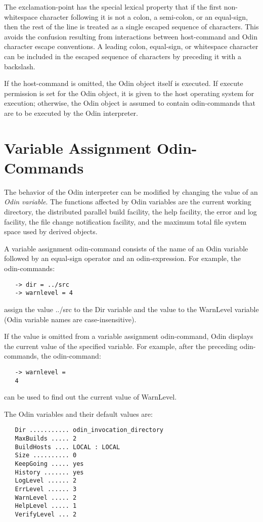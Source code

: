 The exclamation-point has the special lexical property that if the
first non-whitespace character following it
is not a colon, a semi-colon, or an equal-sign,
then the rest of the line is treated as a single escaped sequence of
characters.
This avoids the confusion resulting from interactions between host-command
and Odin character escape conventions.
A leading colon, equal-sign, or whitespace character can be
included in the escaped sequence of characters by preceding it
with a backslash.

If the host-command is omitted, the Odin object itself is executed.
If execute permission is set for the Odin object,
it is given to the host operating system for execution;
otherwise, the Odin object is assumed to contain odin-commands that are 
to be executed by the Odin interpreter.


\section{Variable Assignment Odin-Commands}
\label{variable}

The behavior of the Odin interpreter can be modified by changing the value
of an {\em Odin variable}.
The functions affected by Odin variables are
the current working directory,
the distributed parallel build facility,
the help facility, the error and log facility,
the file change notification facility, and
the maximum total file system space used by derived objects.

A variable assignment odin-command consists of the name of an Odin variable
followed by an equal-sign operator and an odin-expression.
For example, the odin-commands:
\begin{verbatim}
   -> dir = ../src
   -> warnlevel = 4
\end{verbatim}
assign the value {\ex ../src} to the {\ex Dir} variable
and the value {} to the {\ex WarnLevel} variable
(Odin variable names are case-insensitive).

If the value is omitted from a variable assignment odin-command,
Odin displays the current value of the specified variable.
For example, after the preceding odin-commands, the odin-command:
\begin{verbatim}
   -> warnlevel =
   4
\end{verbatim}
can be used to find out the current value of {\ex WarnLevel}.

The Odin variables and their default values are:
\begin{verbatim}
   Dir ........... odin_invocation_directory
   MaxBuilds ..... 2
   BuildHosts .... LOCAL : LOCAL
   Size .......... 0
   KeepGoing ..... yes
   History ....... yes
   LogLevel ...... 2
   ErrLevel ...... 3
   WarnLevel ..... 2
   HelpLevel ..... 1
   VerifyLevel ... 2
\end{verbatim}

